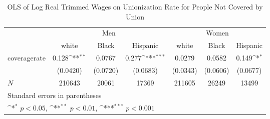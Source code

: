 \begin{table}[htbp]\centering
\def\sym#1{\ifmmode^{#1}\else\(^{#1}\)\fi}
\caption{OLS of Log Real Trimmed Wages on Unionization Rate for People Not Covered by Union}
\begin{tabular}{l*{6}{c}}
\hline\hline
            &\multicolumn{3}{c}{Men}                                          &\multicolumn{3}{c}{Women}                                        \\\cmidrule(lr){2-4}\cmidrule(lr){5-7}
            &\multicolumn{1}{c}{white}&\multicolumn{1}{c}{Black}&\multicolumn{1}{c}{Hispanic}&\multicolumn{1}{c}{white}&\multicolumn{1}{c}{Black}&\multicolumn{1}{c}{Hispanic}\\
\hline
coveragerate&       0.128\sym{**} &      0.0767         &       0.277\sym{***}&      0.0279         &      0.0582         &       0.149\sym{*}  \\
            &    (0.0420)         &    (0.0720)         &    (0.0683)         &    (0.0343)         &    (0.0606)         &    (0.0677)         \\
\hline
\(N\)       &      210643         &       20061         &       17369         &      211605         &       26249         &       13499         \\
\hline\hline
\multicolumn{7}{l}{\footnotesize Standard errors in parentheses}\\
\multicolumn{7}{l}{\footnotesize \sym{*} \(p<0.05\), \sym{**} \(p<0.01\), \sym{***} \(p<0.001\)}\\
\end{tabular}
\end{table}
